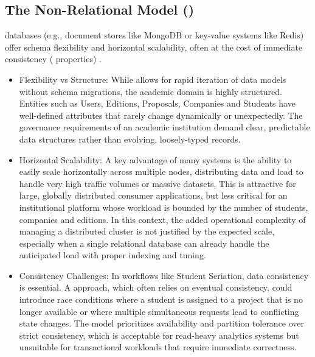     \subsection{The Non-Relational Model ()}
        {
             databases (e.g., document stores like MongoDB or key-value systems like Redis) offer schema flexibility and horizontal scalability, often at the cost
            of immediate consistency ( properties) \cite{ali-2019-sql-nosql-bigdata}.
        }
        \begin{itemize}
            \item {
                Flexibility vs Structure: While  allows for rapid iteration of data models without schema migrations,
                the academic domain is highly structured. 
                Entities such as Users, Editions, Proposals, Companies and Students have well-defined attributes that rarely change dynamically or unexpectedly.
                The governance requirements of an academic institution demand clear, predictable data structures rather than evolving, loosely-typed records.
            }
            \item {
                Horizontal Scalability: A key advantage of many  systems is the ability to easily scale horizontally across multiple nodes,
                distributing data and load to handle very high traffic volumes or massive datasets.
                This is attractive for large, globally distributed consumer applications, but less critical for an institutional platform whose 
                workload is bounded by the number of students, companies and editions.
                In this context, the added operational complexity of managing a distributed  cluster is not justified by the expected scale,
                especially when a single relational database can already handle the anticipated load with proper indexing and tuning.
            }
            \item {
                Consistency Challenges: In workflows like Student Seriation, data consistency is essential. 
                A  approach, which often relies on eventual consistency, could introduce race conditions where a student is assigned to a project that is no longer available or where multiple simultaneous requests lead to conflicting state changes.
                The  model prioritizes availability and partition tolerance over strict consistency, which is acceptable for read-heavy analytics systems but unsuitable for transactional workloads that require immediate correctness.
            }
        \end{itemize}

